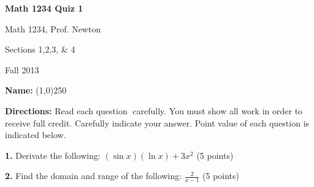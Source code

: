 \documentclass[fleqn, letterpaper]{article}
\begin{document}
\noindent




\begin{center}\textbf{Math 1234 Quiz 1}\end{center}

\noindent
\begin{bf}
Math 1234, Prof. Newton

Sections 1,2,3, \& 4

Fall 2013
\end{bf}

\vspace{.5 cm}

\noindent
{\bfseries Name:} \line(1,0){250}

\noindent
{\bfseries Directions:} Read each question carefully. You must show all work in order to receive full credit. Carefully indicate your answer. Point value of each question is indicated below.

\vspace{.5 cm}
\noindent
{\bfseries 1.} Derivate the following: $(\sin{x}) (\ln{x}) + 3x^2$ (5 points)

\vspace{10 cm}
\noindent
{\bfseries 2.} Find the domain and range of the following: $\frac{2}{x-1}$ (5 points)
\end{document}
